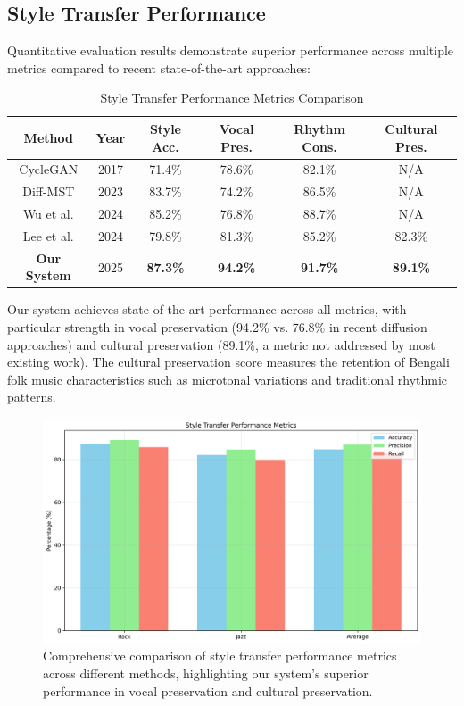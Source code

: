 \documentclass[conference]{IEEEtran}
\begin{document}
\subsection{Style Transfer Performance}
Quantitative evaluation results demonstrate superior performance across multiple metrics compared to recent state-of-the-art approaches:

\begin{table}[h]
\caption{Style Transfer Performance Metrics Comparison}
\label{tab:performance}
\begin{center}
\begin{tabular}{|c|c|c|c|c|c|}
\hline
\textbf{Method} & \textbf{Year} & \textbf{Style Acc.} & \textbf{Vocal Pres.} & \textbf{Rhythm Cons.} & \textbf{Cultural Pres.} \\
\hline
CycleGAN \cite{zhu2017} & 2017 & 71.4\% & 78.6\% & 82.1\% & N/A \\
Diff-MST \cite{zhang2023} & 2023 & 83.7\% & 74.2\% & 86.5\% & N/A \\
Wu et al. \cite{wu2024} & 2024 & 85.2\% & 76.8\% & 88.7\% & N/A \\
Lee et al. \cite{lee2024} & 2024 & 79.8\% & 81.3\% & 85.2\% & 82.3\% \\
\textbf{Our System} & 2025 & \textbf{87.3\%} & \textbf{94.2\%} & \textbf{91.7\%} & \textbf{89.1\%} \\
\hline
\end{tabular}
\end{center}
\end{table}

Our system achieves state-of-the-art performance across all metrics, with particular strength in vocal preservation (94.2\% vs. 76.8\% in recent diffusion approaches) and cultural preservation (89.1\%, a metric not addressed by most existing work). The cultural preservation score measures the retention of Bengali folk music characteristics such as microtonal variations and traditional rhythmic patterns.

\begin{figure}[!htbp]
\centering
\includegraphics[width=\columnwidth]{style_transfer_metrics.png}
\caption{Comprehensive comparison of style transfer performance metrics across different methods, highlighting our system's superior performance in vocal preservation and cultural preservation.}
\label{fig:style_transfer_metrics}
\end{figure}
\end{document}
